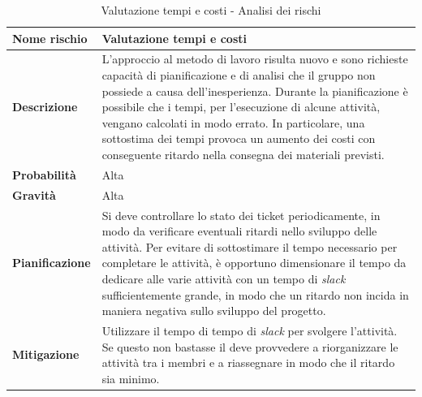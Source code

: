 \documentclass[12pt,a4paper]{article}
\begin{document}
\begin{table}[H]
	\begin{center}
		\begin{tabular}{p{} p{}}
			\toprule
			\textbf{Nome rischio} & \textbf{Valutazione tempi e costi} \\
			\midrule
			\midrule
			\textbf{Descrizione} & L’approccio al metodo di lavoro risulta nuovo e sono richieste capacità di pianificazione e di analisi che il gruppo non possiede a causa dell’inesperienza. Durante la pianificazione è possibile che i tempi, per l’esecuzione di alcune attività, vengano calcolati in modo errato. In particolare, una sottostima dei tempi provoca un aumento dei costi con conseguente ritardo nella consegna dei materiali previsti. \\
			\midrule
			\textbf{Probabilità} & Alta \\
			\midrule
			\textbf{Gravità} & Alta \\
			\midrule
			\textbf{Pianificazione} & Si deve controllare lo stato dei ticket periodicamente, in modo da verificare eventuali ritardi nello sviluppo delle attività. Per evitare di sottostimare il tempo necessario per completare le attività, è opportuno dimensionare il tempo da dedicare alle varie attività con un tempo di \textit{slack} sufficientemente grande, in modo che un ritardo non incida in maniera negativa sullo sviluppo del progetto. \\
			\midrule
			\textbf{Mitigazione} & Utilizzare il tempo di tempo di \textit{slack} per svolgere l'attività. Se questo non bastasse il \PM{} deve provvedere a riorganizzare le attività tra i membri e a riassegnare \textit{\mgls{task}} in modo che il ritardo sia minimo. \\
			\bottomrule
		\end{tabular}
		\caption{Valutazione tempi e costi - Analisi dei rischi}
	\end{center}
\end{table}
\end{document}
